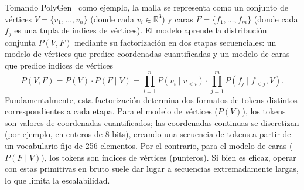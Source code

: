 \documentclass[../../book-main_es.tex]{subfiles}
\begin{document}
\begin{itemize}


Tomando PolyGen~\cite{nash2020polygen} como ejemplo, la malla se representa como un conjunto de
vértices $V = \{v_1, \dots, v_n\}$ (donde cada $v_i \in \mathbb{R}^3$) y caras
$F = \{f_1, \dots, f_m\}$ (donde cada $f_j$ es una tupla de índices de vértices).
El modelo aprende la distribución conjunta $P(V, F)$ mediante su factorización en dos etapas secuenciales:
un modelo de vértices que predice coordenadas cuantificadas y un modelo de caras que predice índices de vértices
\begin{equation}
    P(V, F) = P(V) \cdot P(F \mid V) = \prod_{i=1}^{n} P(v_i \mid v_{<i}) \cdot \prod_{j=1}^{m} P(f_j \mid f_{<j}, V).
\end{equation}
Fundamentalmente, esta factorización determina dos formatos de tokens distintos correspondientes a cada etapa.
Para el modelo de vértices ($P(V)$), los tokens son valores de coordenadas cuantificados;
las coordenadas continuas se discretizan (por ejemplo, en enteros de 8 bits),
creando una secuencia de tokens a partir de un vocabulario fijo de 256 elementos.
Por el contrario, para el modelo de caras ($P(F \mid V)$), los tokens son índices de vértices (punteros).
Si bien es eficaz, operar con estas primitivas en bruto suele dar lugar a secuencias 
extremadamente largas, lo que limita la escalabilidad.


\end{itemize}
\end{document}
